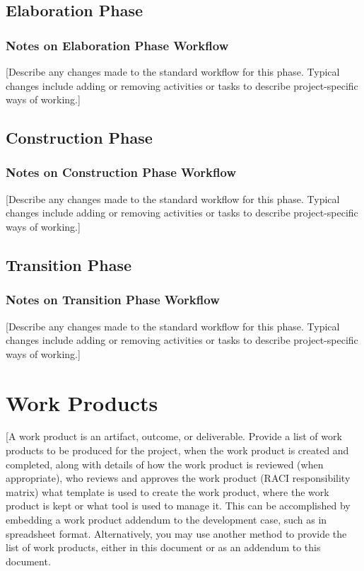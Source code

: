 \subsection*{Elaboration Phase}

\subsubsection*{Notes on Elaboration Phase Workflow}
[Describe any changes made to the standard workflow for this phase. Typical changes include adding or removing activities or tasks to describe project-specific ways of working.]

\subsection*{Construction Phase}
\subsubsection*{Notes on Construction Phase Workflow} 
[Describe any changes made to the standard workflow for this phase. Typical changes include adding or removing activities or tasks to describe project-specific ways of working.]

\subsection*{Transition Phase}
\subsubsection*{Notes on Transition Phase Workflow}
[Describe any changes made to the standard workflow for this phase. Typical changes include adding or removing activities or tasks to describe project-specific ways of working.]

\section*{Work Products}
[A work product is an artifact, outcome, or deliverable. Provide a list of work products to be produced for the project, when the work product is created and completed, along with details of how the work product is reviewed (when appropriate), who reviews and approves the work product (RACI responsibility matrix) what template is used to create the work product, where the work product is kept or what tool is used to manage it. This can be accomplished by embedding a work product addendum to the development case, such as in spreadsheet format. Alternatively, you may use another method to provide the list of work products, either in this document or as an addendum to this document.

